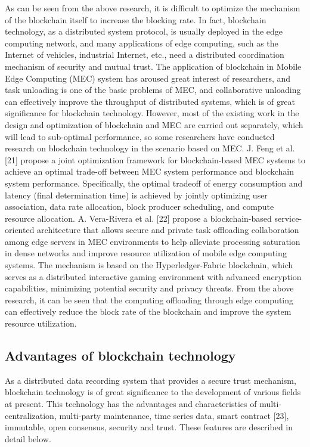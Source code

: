 \documentclass[lettersize,journal]{IEEEtran}
\begin{document}
As can be seen from the above research, it is difficult to optimize the mechanism of the blockchain itself to increase the blocking rate. In fact, blockchain technology, as a distributed system protocol, is usually deployed in the edge computing network, and many applications of edge computing, such as the Internet of vehicles, industrial Internet, etc., need a distributed coordination mechanism of security and mutual trust. The application of blockchain in Mobile Edge Computing (MEC) system has aroused great interest of researchers, and task unloading is one of the basic problems of MEC, and collaborative unloading can effectively improve the throughput of distributed systems, which is of great significance for blockchain technology. However, most of the existing work in the design and optimization of blockchain and MEC are carried out separately, which will lead to sub-optimal performance, so some researchers have conducted research on blockchain technology in the scenario based on MEC. J. Feng et al. [21] propose a joint optimization framework for blockchain-based MEC systems to achieve an optimal trade-off between MEC system performance and blockchain system performance. Specifically, the optimal tradeoff of energy consumption and latency (final determination time) is achieved by jointly optimizing user association, data rate allocation, block producer scheduling, and compute resource allocation. A. Vera-Rivera et al. [22] propose a blockchain-based service-oriented architecture that allows secure and private task offloading collaboration among edge servers in MEC environments to help alleviate processing saturation in dense networks and improve resource utilization of mobile edge computing systems. The mechanism is based on the Hyperledger-Fabric blockchain, which serves as a distributed interactive gaming environment with advanced encryption capabilities, minimizing potential security and privacy threats. From the above research, it can be seen that the computing offloading through edge computing can effectively reduce the block rate of the blockchain and improve the system resource utilization.
\subsection{Advantages of blockchain technology}
As a distributed data recording system that provides a secure trust mechanism, blockchain technology is of great significance to the development of various fields at present. This technology has the advantages and characteristics of multi-centralization, multi-party maintenance, time series data, smart contract [23], immutable, open consensus, security and trust. These features are described in detail below.
\end{document}

